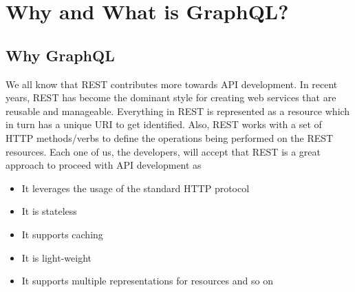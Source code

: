 \documentclass[../main.tex]{subfiles}
\begin{document}
\chapter{Why and What is GraphQL?}
\section{Why GraphQL}
We all know that REST contributes more towards API development. In recent years, REST has become the dominant style for creating web services that are reusable and manageable. Everything in REST is represented as a resource which in turn has a unique URI to get identified. Also, REST works with a set of HTTP methods/verbs to define the operations being performed on the REST resources. Each one of us, the developers, will accept that REST is a great approach to proceed with API development as 

\begin{itemize}
  \item {It leverages the usage of the standard HTTP protocol}
  \item {It is stateless}
  \item {It supports caching}
  \item {It is light-weight}
  \item {It supports multiple representations for resources and so on}
\end{itemize}



\printglossaries
\end{document}
